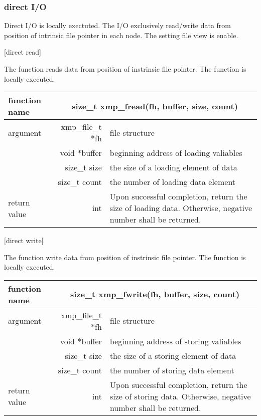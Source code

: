   \subsubsection{direct I/O}

   Direct I/O is locally exectuted. The I/O exclusively read/write data
   from position of intrinsic file pointer in each node.
   The setting file view is enable.

   [direct read]

   The function reads data from position of instrinsic file
   pointer.
   The function is locally executed.

   \begin{table}[h]
    \begin{center}
     \begin{tabular}{|l|r|p{80mm}|}
      \hline
      {\bf function name}  & \multicolumn{2}{c|}{\bf size\_t
      xmp\_fread(fh, buffer, size, count)} \\ \hline \hline
      argument & xmp\_file\_t $*$fh & file structure \\ \cline{2-3}
      & void $*$buffer & beginning address of loading valiables \\ \cline{2-3}
      & size\_t size & the size of a loading element of data \\ \cline{2-3}
      & size\_t count & the number of loading data element \\ \hline
      return value & int & Upon successful completion, return the size
	      of loading data. Otherwise, negative number shall be
	      returned. \\ \hline
      \end{tabular}
     \end{center}
    \label{tb:aaa}
   \end{table}

   [direct write]

   The function write data from position of instrinsic file
   pointer.
   The function is locally executed.

   \begin{table}[h]
    \begin{center}
     \begin{tabular}{|l|r|p{80mm}|}
      \hline
      {\bf function name}  & \multicolumn{2}{c|}{\bf size\_t
      xmp\_fwrite(fh, buffer, size, count)} \\ \hline \hline
      argument & xmp\_file\_t $*$fh & file structure \\ \cline{2-3}
      & void $*$buffer & beginning address of storing valiables \\ \cline{2-3}
      & size\_t size & the size of a storing element of data \\ \cline{2-3}
      & size\_t count & the number of storing data element \\ \hline
      return value & int & Upon successful completion, return the size
	      of storing data. Otherwise, negative number shall be
	      returned. \\ \hline
      \end{tabular}
     \end{center}
    \label{tb:aaa}
   \end{table}

   
